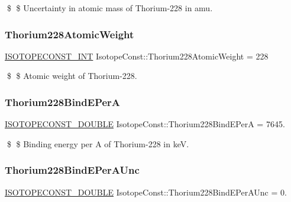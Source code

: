 \$ \$ Uncertainty in atomic mass of Thorium-\/228 in amu. \mbox{\label{group___isotope_const-_thorium-_th228_ga1dfb53e82567d7df38ef73dc7ea01d72}} 
\subsubsection{\texorpdfstring{Thorium228\+Atomic\+Weight}{Thorium228AtomicWeight}}
{\footnotesize\ttfamily \mbox{\hyperlink{group___isotope_const-_macros_ga5f18360b3e99483a35c32d789e62621c}{I\+S\+O\+T\+O\+P\+E\+C\+O\+N\+S\+T\+\_\+\+I\+NT}} Isotope\+Const\+::\+Thorium228\+Atomic\+Weight = 228}

\$ \$ Atomic weight of Thorium-\/228. \mbox{\label{group___isotope_const-_thorium-_th228_ga5687716b64cd53a53d5f2c40331e81c3}} 
\subsubsection{\texorpdfstring{Thorium228\+Bind\+E\+PerA}{Thorium228BindEPerA}}
{\footnotesize\ttfamily \mbox{\hyperlink{group___isotope_const-_macros_ga8f45a7272ce02c0b4c65c44636ed719a}{I\+S\+O\+T\+O\+P\+E\+C\+O\+N\+S\+T\+\_\+\+D\+O\+U\+B\+LE}} Isotope\+Const\+::\+Thorium228\+Bind\+E\+PerA = 7645.}

\$ \$ Binding energy per A of Thorium-\/228 in keV. \mbox{\label{group___isotope_const-_thorium-_th228_gae4e23a6bbd8744217904a641201c65cb}} 
\subsubsection{\texorpdfstring{Thorium228\+Bind\+E\+Per\+A\+Unc}{Thorium228BindEPerAUnc}}
{\footnotesize\ttfamily \mbox{\hyperlink{group___isotope_const-_macros_ga8f45a7272ce02c0b4c65c44636ed719a}{I\+S\+O\+T\+O\+P\+E\+C\+O\+N\+S\+T\+\_\+\+D\+O\+U\+B\+LE}} Isotope\+Const\+::\+Thorium228\+Bind\+E\+Per\+A\+Unc = 0.}

